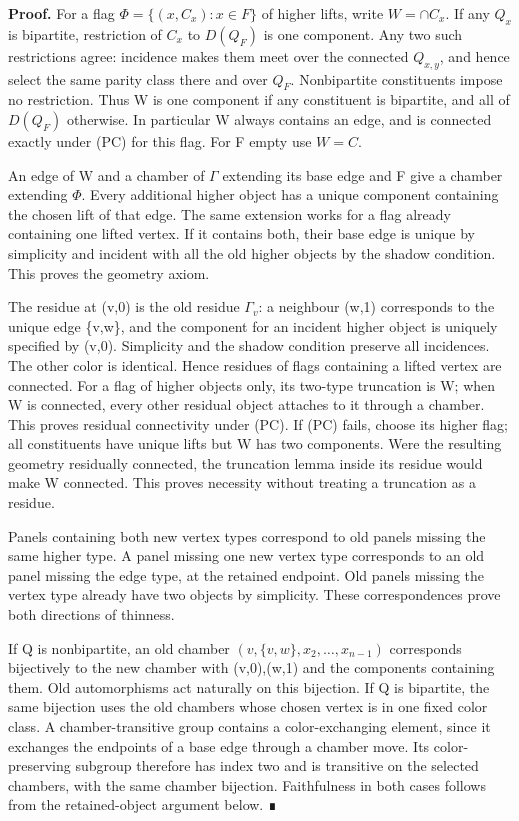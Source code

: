 \documentclass[
  11pt,
  a4paper,
]{article}
\begin{document}
\textbf{Proof.} For a flag \(\Phi =\{(x,C_x):x\in F\}\) of higher lifts,
write \(W=\cap C_x\). If any \(Q_x\) is bipartite, restriction of
\(C_x\) to \(D(Q_F)\) is one component. Any two such restrictions agree:
incidence makes them meet over the connected \(Q_{x,y}\), and hence
select the same parity class there and over \(Q_F\). Nonbipartite
constituents impose no restriction. Thus W is one component if any
constituent is bipartite, and all of \(D(Q_F)\) otherwise. In particular
W always contains an edge, and is connected exactly under (PC) for this
flag. For F empty use \(W=C\).

An edge of W and a chamber of \(\Gamma\) extending its base edge and F
give a chamber extending \(\Phi\). Every additional higher object has a
unique component containing the chosen lift of that edge. The same
extension works for a flag already containing one lifted vertex. If it
contains both, their base edge is unique by simplicity and incident with
all the old higher objects by the shadow condition. This proves the
geometry axiom.

The residue at (v,0) is the old residue \(\Gamma _v\): a neighbour (w,1)
corresponds to the unique edge \{v,w\}, and the component for an
incident higher object is uniquely specified by (v,0). Simplicity and
the shadow condition preserve all incidences. The other color is
identical. Hence residues of flags containing a lifted vertex are
connected. For a flag of higher objects only, its two-type truncation is
W; when W is connected, every other residual object attaches to it
through a chamber. This proves residual connectivity under (PC). If (PC)
fails, choose its higher flag; all constituents have unique lifts but W
has two components. Were the resulting geometry residually connected,
the truncation lemma inside its residue would make W connected. This
proves necessity without treating a truncation as a residue.

Panels containing both new vertex types correspond to old panels missing
the same higher type. A panel missing one new vertex type corresponds to
an old panel missing the edge type, at the retained endpoint. Old panels
missing the vertex type already have two objects by simplicity. These
correspondences prove both directions of thinness.

If Q is nonbipartite, an old chamber
\((v,\{v,w\},x_{2},\ldots ,x_{n-1})\) corresponds bijectively to the new
chamber with (v,0),(w,1) and the components containing them. Old
automorphisms act naturally on this bijection. If Q is bipartite, the
same bijection uses the old chambers whose chosen vertex is in one fixed
color class. A chamber-transitive group contains a color-exchanging
element, since it exchanges the endpoints of a base edge through a
chamber move. Its color-preserving subgroup therefore has index two and
is transitive on the selected chambers, with the same chamber bijection.
Faithfulness in both cases follows from the retained-object argument
below. ∎
\end{document}
